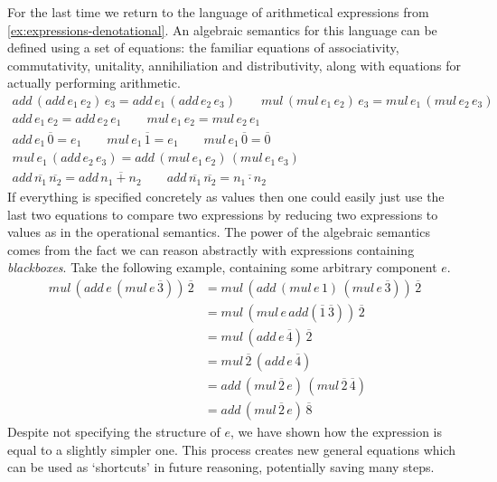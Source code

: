 \begin{example}\label{ex:expressions-algebraic}
    For the last time we return to the language of arithmetical expressions from
    \cref{ex:expressions-denotational}.
    An algebraic semantics for this language can be defined using a set of
    equations: the familiar equations of associativity, commutativity,
    unitality, annihiliation and distributivity, along with equations for
    actually performing arithmetic.
    \begin{gather*}
        add\,(add\,e_1\,e_2)\,e_3 = add\,e_1\,(add\,e_2\,e_3)
        \qquad
        mul\,(mul\,e_1\,e_2)\,e_3 = mul\,e_1\,(mul\,e_2\,e_3)
        \\
        add\,e_1\,e_2 = add\,e_2\,e_1
        \qquad
        mul\,e_1\,e_2 = mul\,e_2\,e_1
        \\
        add\,e_1\,\overline{0} = e_1
        \qquad
        mul\,e_1\,\overline{1} = e_1
        \qquad
        mul\,e_1\,\overline{0} = \overline{0}
        \\
        mul\,e_1\,(add\,e_2\,e_3) = add\,(mul\,e_1\,e_2)\,(mul\,e_1\,e_3)
        \\
        add\,\overline{n_1}\,\overline{n_2} = add\,\overline{n_1+n_2}
        \qquad
        add\,\overline{n_1}\,\overline{n_2} = \overline{n_1 \cdot n_2}
    \end{gather*}
    If everything is specified concretely as values then one could easily just
    use the last two equations to compare two expressions by reducing
    two expressions to values as in the operational semantics.
    The power of the algebraic semantics comes from the fact we can reason
    abstractly with expressions containing \emph{blackboxes}.
    Take the following example, containing some arbitrary component \(e\).
    \begin{align*}
        mul\,(add\,e\,(mul\,e\,\overline{3}))\,\overline{2}
        &=
        mul\,(add\,(mul\,e\,1)\,(mul\,e\,\overline{3}))\,\overline{2}
        \\
        &=
        mul\,(mul\,e\, add(\overline{1}\,\overline{3}))\,\overline{2}
        \\
        &=
        mul\,(add\,e\,\overline{4})\,\overline{2}
        \\
        &=
        mul\,\overline{2}\,(add\,e\,\overline{4})
        \\
        &=
        add\,(mul\,\overline{2}\,e)\,(mul\,\overline{2}\,\overline{4})
        \\
        &=
        add\,(mul\,\overline{2}\,e)\,\overline{8}
    \end{align*}
    Despite not specifying the structure of \(e\), we have
    shown how the expression is equal to a slightly simpler one.
    This process creates new general equations which can be used as `shortcuts'
    in future reasoning, potentially saving many steps.
\end{example}

